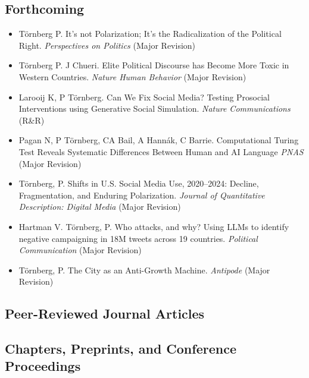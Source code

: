 \documentclass[11pt,a4paper]{moderncv}
\begin{document}

\subsection*{Forthcoming}
\begin{itemize}
    \item Törnberg P. It's not Polarization; It's the Radicalization of the Political Right. \textit{Perspectives on Politics} (Major Revision)
    \item Törnberg P. J Chueri. Elite Political Discourse has Become More Toxic in Western Countries. \textit{Nature Human Behavior} (Major Revision)
    \item Larooij K, P Törnberg. Can We Fix Social Media? Testing Prosocial Interventions using Generative Social Simulation. \textit{Nature Communications} (R\&R)
    \item Pagan N, P Törnberg, CA Bail, A Hannák, C Barrie. Computational Turing Test Reveals Systematic Differences Between Human and AI Language \textit{PNAS}  (Major Revision)
    \item Törnberg, P. Shifts in U.S. Social Media Use, 2020–2024: Decline, Fragmentation, and Enduring Polarization. \textit{Journal of Quantitative Description: Digital Media} (Major Revision)
    \item Hartman V. Törnberg, P. Who attacks, and why? Using LLMs to identify negative campaigning in 18M tweets across 19 countries. \textit{Political Communication} (Major Revision)
    \item Törnberg, P. The City as an Anti-Growth Machine. \textit{Antipode} (Major Revision)
    
\end{itemize}


\subsection*{Peer-Reviewed Journal Articles}
\printbibliography[type=article,heading=none,resetnumbers=true]

\subsection*{Chapters, Preprints, and Conference Proceedings}
\printbibliography[nottype=article,nottype=book,heading=none,resetnumbers=false]
\end{document}
